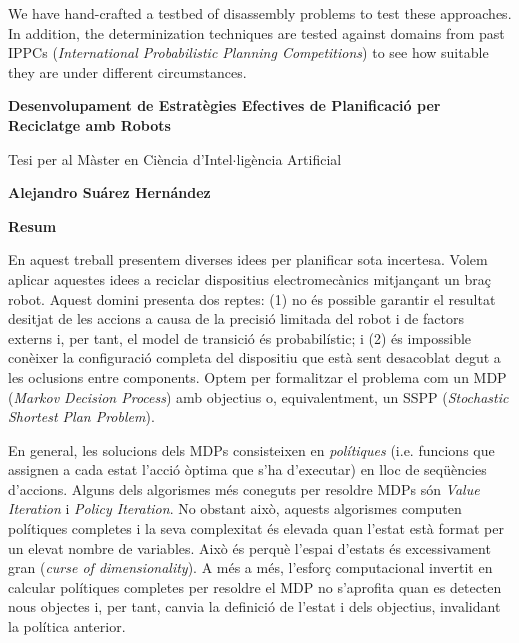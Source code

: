 We have hand-crafted a testbed of disassembly problems to test these
approaches. In addition, the determinization techniques are tested
against domains
from past IPPCs (\emph{International Probabilistic Planning Competitions})
to see how suitable they are under different circumstances.



\cleardoublepage

\thispagestyle{plain}
\begin{center}
	\Large
	\textbf{Desenvolupament de Estratègies Efectives de Planificació per Reciclatge amb Robots}
	
	\vspace{0.4cm}
	\large
	Tesi per al Màster en Ciència d'Intel$\cdot$ligència Artificial
	
	\vspace{0.4cm}
	\textbf{Alejandro Suárez Hernández}
	
	\vspace{0.9cm}
	\textbf{Resum}
\end{center}

En aquest treball presentem diverses idees per planificar sota incertesa.
Volem aplicar aquestes idees a reciclar dispositius electromecànics
mitjançant un braç robot. Aquest domini presenta dos reptes: (1) no és possible
garantir el resultat desitjat de les accions a causa de la precisió limitada
del robot i de factors externs i, per tant, el model de transició és probabilístic;
i (2) és impossible conèixer la configuració completa del dispositiu
que està sent desacoblat degut a les oclusions entre components.
Optem per formalitzar el problema com un MDP (\emph{Markov Decision Process}) amb
objectius o, equivalentment, un SSPP (\emph{Stochastic Shortest Plan Problem}).

En general, les solucions dels MDPs consisteixen en \emph{polítiques}
(i.e. funcions
que assignen a cada estat l'acció òptima que s'ha d'executar) en lloc de
seqüències d'accions. Alguns dels algorismes més coneguts per resoldre
MDPs són \emph{Value Iteration} i \emph{Policy Iteration}.
No obstant això, aquests algorismes
computen polítiques completes i la seva complexitat és elevada quan l'estat
està format per un elevat nombre de variables. Això és perquè l'espai
d'estats és excessivament gran (\emph{curse of dimensionality}). A més
a més,
l'esforç computacional invertit en calcular polítiques completes per
resoldre el MDP no s'aprofita quan es detecten nous objectes i, per
tant, canvia la definició de l'estat i dels objectius, invalidant la
política anterior.

